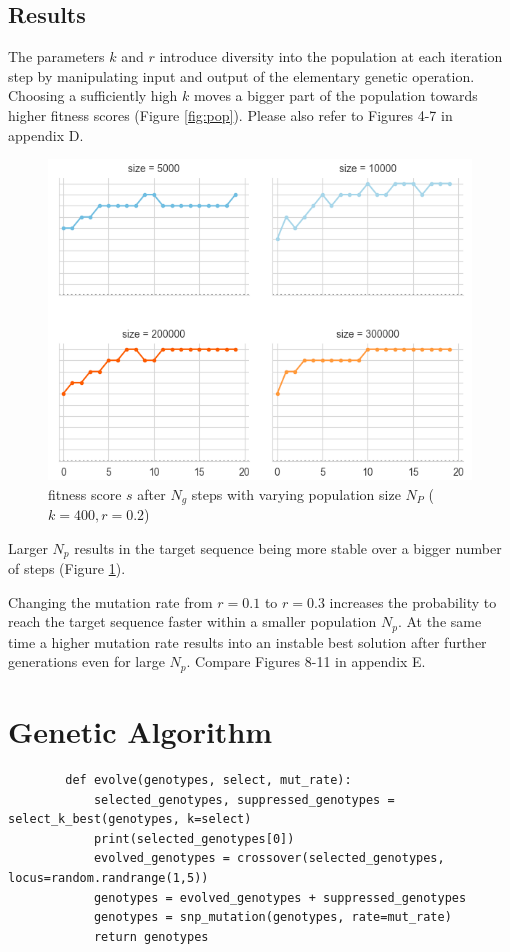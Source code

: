 \documentclass{article}
\begin{document}
\begin{multicols}{2}
		\section{Results}{}
		The parameters \(k\) and \(r\) introduce diversity \cite{naturalcomputation} into the population at each iteration step by manipulating input and output of the elementary genetic operation. Choosing a sufficiently high \(k\) moves a bigger part of the population towards higher fitness scores (Figure \ref{fig:pop}). Please also refer to Figures 4-7 in appendix D.
		\begin{figure}[H]
			\center
			\includegraphics[width=\linewidth]{data/walk_Ng20_k400_snp_02.png}
			\caption{fitness score \(s\) after \(N_g\) steps with varying population size \(N_P\) (\(k=400, r=0.2\))}
	  		\label{fig:walk}
  		\end{figure}
  		Larger \(N_p\) results in the target sequence being more stable over a bigger number of steps (Figure \ref{fig:walk}).

  		Changing the mutation rate from \(r=0.1\) to \(r=0.3\) increases the probability to reach the target sequence faster within a smaller population \(N_p\). At the same time a higher mutation rate results into an instable best solution after further generations even for large \(N_p\). Compare Figures 8-11 in appendix E.
		\end{multicols}

		
		

		\newpage
		\appendix
		\section{Genetic Algorithm}
		\begin{lstlisting}
		def evolve(genotypes, select, mut_rate):
			selected_genotypes, suppressed_genotypes = select_k_best(genotypes, k=select)
			print(selected_genotypes[0])
			evolved_genotypes = crossover(selected_genotypes, locus=random.randrange(1,5))
			genotypes = evolved_genotypes + suppressed_genotypes
			genotypes = snp_mutation(genotypes, rate=mut_rate)
			return genotypes
		\end{lstlisting}
\end{document}
